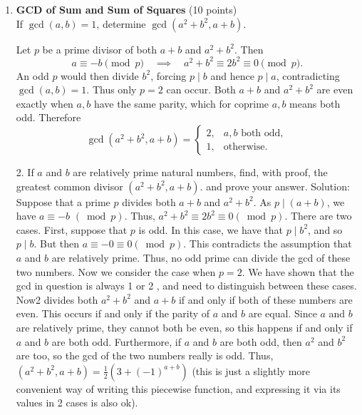 \begin{enumerate}
  \item \textbf{GCD of Sum and Sum of Squares} (10 points)\\
  If \(\gcd(a,b)=1\), determine \(\gcd(a^2+b^2,a+b)\).\\
  \begin{subanswer}
  Let \(p\) be a prime divisor of both \(a+b\) and \(a^2+b^2\).  Then
  \[
    a\equiv -b\pmod p
    \quad\implies\quad
    a^2+b^2\equiv2b^2\equiv0\pmod p.
  \]
  An odd \(p\) would then divide \(b^2\), forcing \(p\mid b\) and hence \(p\mid a\), contradicting \(\gcd(a,b)=1\).  Thus only \(p=2\) can occur.  Both \(a+b\) and \(a^2+b^2\) are even exactly when \(a,b\) have the same parity, which for coprime \(a,b\) means both odd.  Therefore
  \[
    \gcd(a^2+b^2,a+b)
    =
    \begin{cases}
      2,&a,b\text{ both odd},\\
      1,&\text{otherwise}.
    \end{cases}
  \]
  \end{subanswer}
  2. If $a$ and $b$ are relatively prime natural numbers, find, with proof, the greatest common divisor $\left(a^2+b^2, a+b\right)$. and prove your answer.
  Solution:
  Suppose that a prime $p$ divides both $a+b$ and $a^2+b^2$. As $p \mid(a+b)$, we have $a \equiv-b$ $(\bmod p)$. Thus, $a^2+b^2 \equiv 2 b^2 \equiv 0(\bmod p)$. There are two cases. First, suppose that $p$ is odd. In this case, we have that $p \mid b^2$, and so $p \mid b$. But then $a \equiv-0 \equiv 0(\bmod p)$. This contradicts the assumption that $a$ and $b$ are relatively prime. Thus, no odd prime can divide the gcd of these two numbers. Now we consider the case when $p=2$. We have shown that the gcd in question is always 1 or 2 , and need to distinguish between these cases. Now2 divides both $a^2+b^2$ and $a+b$ if and only if both of these numbers are even. This occurs if and only if the parity of $a$ and $b$ are equal. Since $a$ and $b$ are relatively prime, they cannot both be even, so this happens if and only if $a$ and $b$ are both odd. Furthermore, if $a$ and $b$ are both odd, then $a^2$ and $b^2$ are too, so the gcd of the two numbers really is odd. Thus, $\left(a^2+b^2, a+b\right)=\frac{1}{2}\left(3+(-1)^{a+b}\right)$ (this is just a slightly more convenient way of writing this piecewise function, and expressing it via its values in 2 cases is also ok).
  
  


\end{enumerate}
